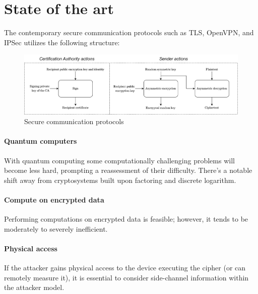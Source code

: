 \section{State of the art}

The contemporary secure communication protocols such as TLS, OpenVPN, and IPSec utilizes the following structure: 
\begin{figure}[H]
    \centering
    \includegraphics[width=1\linewidth]{images/ssp.png}
    \caption{Secure communication protocols}
\end{figure}

\paragraph*{Quantum computers}
With quantum computing some computationally challenging problems will become less hard, prompting a reassessment of their difficulty. 
There's a notable shift away from cryptosystems built upon factoring and discrete logarithm. 

\paragraph*{Compute on encrypted data}
Performing computations on encrypted data is feasible; however, it tends to be moderately to severely inefficient.

\paragraph*{Physical access}
If the attacker gains physical access to the device executing the cipher (or can remotely measure it), it is essential to consider side-channel information within the attacker model.